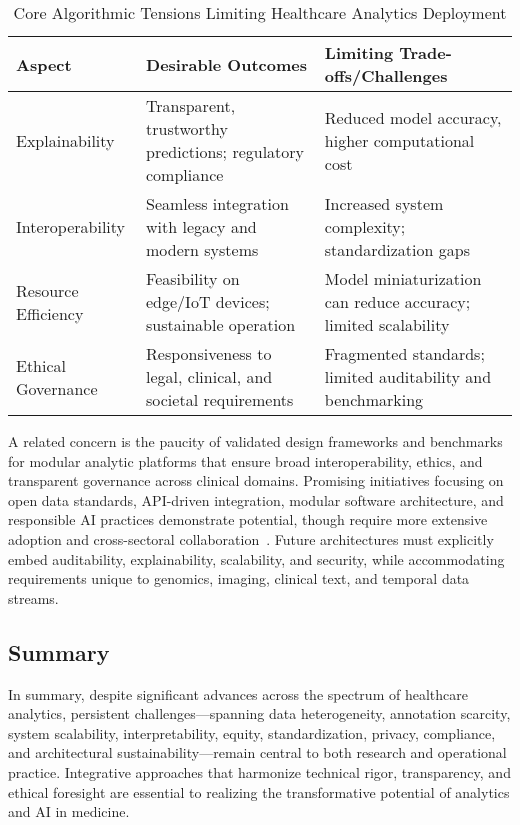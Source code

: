 \documentclass[11pt]{article}
\begin{document}
\begin{table}[ht]
\centering
\caption{Core Algorithmic Tensions Limiting Healthcare Analytics Deployment}
\label{tab:algorithmic_tensions}
\begin{tabular}{p{4cm} p{5.5cm} p{5.5cm}}
\toprule
\textbf{Aspect} & \textbf{Desirable Outcomes} & \textbf{Limiting Trade-offs/Challenges} \\
\midrule
Explainability & Transparent, trustworthy predictions; regulatory compliance & Reduced model accuracy, higher computational cost\\
Interoperability & Seamless integration with legacy and modern systems & Increased system complexity; standardization gaps\\
Resource Efficiency & Feasibility on edge/IoT devices; sustainable operation & Model miniaturization can reduce accuracy; limited scalability \\
Ethical Governance & Responsiveness to legal, clinical, and societal requirements & Fragmented standards; limited auditability and benchmarking\\
\bottomrule
\end{tabular}
\end{table}

A related concern is the paucity of validated design frameworks and benchmarks for modular analytic platforms that ensure broad interoperability, ethics, and transparent governance across clinical domains. Promising initiatives focusing on open data standards, API-driven integration, modular software architecture, and responsible AI practices demonstrate potential, though require more extensive adoption and cross-sectoral collaboration~\cite{ref7,ref24,ref30,ref44,ref45,ref46,ref49,ref50,ref61,ref63,ref64,ref65,ref70,ref71,ref72,ref73,ref74,ref75,ref76,ref77,ref78,ref80,ref84,ref106,ref107}. Future architectures must explicitly embed auditability, explainability, scalability, and security, while accommodating requirements unique to genomics, imaging, clinical text, and temporal data streams.

\subsection{Summary}

In summary, despite significant advances across the spectrum of healthcare analytics, persistent challenges—spanning data heterogeneity, annotation scarcity, system scalability, interpretability, equity, standardization, privacy, compliance, and architectural sustainability—remain central to both research and operational practice. Integrative approaches that harmonize technical rigor, transparency, and ethical foresight are essential to realizing the transformative potential of analytics and AI in medicine.
\end{document}
